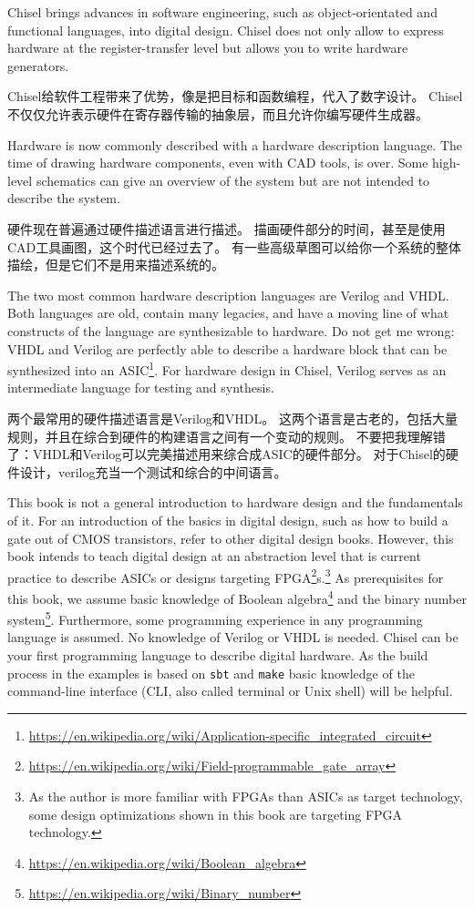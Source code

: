 \documentclass[%
    10pt,
    headinclude, footexclude,
    openright, %
    notitlepage,
    cleardoubleempty,
    headsepline,
    pointlessnumbers,
    bibtotoc, idxtotoc,
    ]{scrbook}
\newcommand{\code}[1]{{\small{\texttt{#1}}}}
\newcommand{\myref}[2]{\href{#1}{#2}}
\renewcommand{\myref}[2]{{#2}{\footnote{\url{#1}}}}
\begin{document}
Chisel brings advances in software engineering, such as object-orientated
and functional languages, into digital design.
Chisel does not only allow to express hardware at the register-transfer level
but allows you to write hardware generators.

Chisel给软件工程带来了优势，像是把目标和函数编程，代入了数字设计。
Chisel不仅仅允许表示硬件在寄存器传输的抽象层，而且允许你编写硬件生成器。

Hardware is now commonly described with a hardware description language.
The time of drawing hardware components, even with CAD tools, is
over. Some high-level schematics can give an overview of the system but are
not intended to describe the system.

硬件现在普遍通过硬件描述语言进行描述。
描画硬件部分的时间，甚至是使用CAD工具画图，这个时代已经过去了。
有一些高级草图可以给你一个系统的整体描绘，但是它们不是用来描述系统的。

The two most common hardware description languages are Verilog and VHDL.
Both languages are old, contain many legacies, and have a moving line of what
constructs of the language are synthesizable to hardware.
Do not get me wrong: VHDL and Verilog are perfectly able to describe a hardware
block that can be synthesized into an
\myref{https://en.wikipedia.org/wiki/Application-specific_integrated_circuit}{ASIC}.
For hardware design in Chisel, Verilog serves as an intermediate language
for testing and synthesis.

两个最常用的硬件描述语言是Verilog和VHDL。
这两个语言是古老的，包括大量规则，并且在综合到硬件的构建语言之间有一个变动的规则。
不要把我理解错了：VHDL和Verilog可以完美描述用来综合成ASIC的硬件部分。
对于Chisel的硬件设计，verilog充当一个测试和综合的中间语言。

This book is not a general introduction to hardware design and the fundamentals of it.
For an introduction of the basics in digital design, such as how to build a gate out of
CMOS transistors, refer to other digital design books.
However, this book intends to teach digital design at an abstraction level that is
current practice to describe ASICs or designs targeting
\myref{https://en.wikipedia.org/wiki/Field-programmable_gate_array}{FPGA}s.\footnote{As the author is more familiar with FPGAs
than ASICs as target technology, some design optimizations shown in this book are
targeting FPGA technology.}
As prerequisites for this book, we assume basic knowledge of
\myref{https://en.wikipedia.org/wiki/Boolean_algebra}{Boolean algebra} and the
\myref{https://en.wikipedia.org/wiki/Binary_number}{binary number system}.
Furthermore, some programming experience in any programming language
is assumed. No knowledge of Verilog or VHDL is needed.
Chisel can be your first programming language to describe digital hardware.
As the build process in the examples is based on \code{sbt} and \code{make}
basic knowledge of the command-line interface (CLI, also called terminal or
Unix shell) will be helpful.
\end{document}
